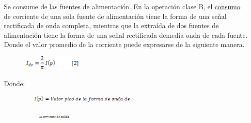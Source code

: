 \documentclass[12pt]{article}
\begin{document}

Se consume de las fuentes de alimentación. En la operación clase B, el \href{https://www.monografias.com/trabajos35/consumo-inversion/consumo-inversion.shtml}{consumo} de corriente de una sola fuente de alimentación tiene la forma de una señal rectificada de onda completa, mientras que la extraída de dos fuentes de alimentación tiene la forma de una señal rectificada demedia onda de cada fuente. Donde el valor promedio de la corriente puede expresarse de la siguiente manera.\par




\begin{figure}[H]
	\begin{Center}
		\includegraphics[width=1.25in,height=0.3in]{./media/image16.gif}
	\end{Center}
\end{figure}



\par

Donde:\par




\begin{figure}[H]
	\begin{Center}
		\includegraphics[width=2.57in,height=0.15in]{./media/image17.gif}
	\end{Center}
\end{figure}



\par




\begin{figure}[H]
	\begin{Center}
		\includegraphics[width=1.34in,height=0.09in]{./media/image18.gif}
	\end{Center}
\end{figure}
\end{document}
